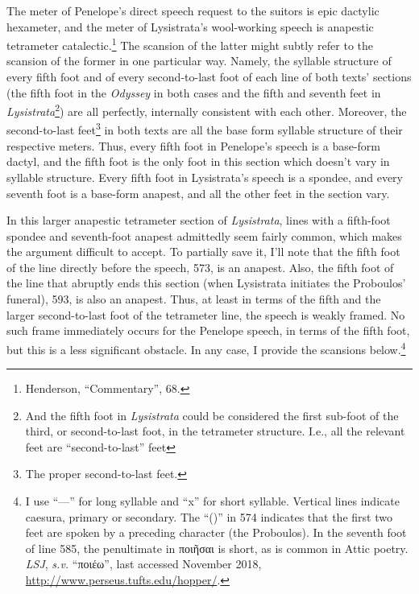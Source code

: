 \documentclass[12pt]{article}
\begin{document}
The meter of Penelope's direct speech request to the suitors is epic dactylic hexameter, and the meter of Lysistrata's wool-working speech is anapestic tetrameter catalectic.\footnote{Henderson, ``Commentary'', 68.} The scansion of the latter might subtly refer to the scansion of the former in one particular way. Namely, the syllable structure of every fifth foot and of every second-to-last foot of each line of both texts' sections (the fifth foot in the \textit{Odyssey} in both cases and the fifth and seventh feet in \textit{Lysistrata}\footnote{And the fifth foot in \textit{Lysistrata} could be considered the first sub-foot of the third, or second-to-last foot, in the tetrameter structure. I.e., all the relevant feet are ``second-to-last'' feet}) are all perfectly, internally consistent with each other. Moreover, the second-to-last feet\footnote{The proper second-to-last feet.} in both texts are all the base form syllable structure of their respective meters. Thus, every fifth foot in Penelope's speech is a base-form dactyl, and the fifth foot is the only foot in this section which doesn't vary in syllable structure. Every fifth foot in Lysistrata's speech is a spondee, and every seventh foot is a base-form anapest, and all the other feet in the section vary.

In this larger anapestic tetrameter section of \textit{Lysistrata}, lines with a fifth-foot spondee and seventh-foot anapest admittedly seem fairly common, which makes the argument difficult to accept. To partially save it, I'll note that the fifth foot of the line directly before the speech, 573, is an anapest. Also, the fifth foot of the line that abruptly ends this section (when Lysistrata initiates the Proboulos' funeral), 593, is also an anapest. Thus, at least in terms of the fifth and the larger second-to-last foot of the tetrameter line, the speech is weakly framed. No such frame immediately occurs for the Penelope speech, in terms of the fifth foot, but this is a less significant obstacle. In any case, I provide the scansions below.\footnote{I use ``---'' for long syllable and ``x'' for short syllable. Vertical lines indicate caesura, primary or secondary. The ``()'' in 574 indicates that the first two feet are spoken by a preceding character (the Proboulos). In the seventh foot of line 585, the penultimate in ποιῆσαι is short, as is common in Attic poetry. \textit{LSJ}, \textit{s.v.} ``ποιέω'',  last accessed November 2018, \url{http://www.perseus.tufts.edu/hopper/}.}
\end{document}
